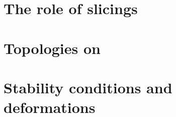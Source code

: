 \section{The role of slicings}
\section{Topologies on}%
\section{Stability conditions and deformations}